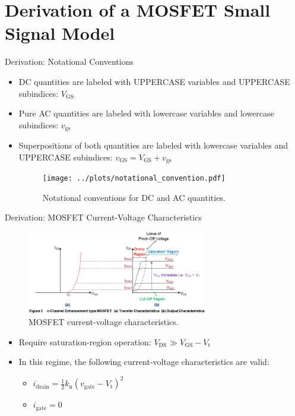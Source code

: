 \section{Derivation of a MOSFET Small Signal Model}
\begin{frame}{Derivation: Notational Conventions}
    \begin{itemize}
        \item DC quantities are labeled with UPPERCASE variables and UPPERCASE subindices: 
        $V_{\mathrm{GS}}$
        \item Pure AC quantities are labeled with lowercase variables and lowercase subindices: 
        $v_{\mathrm{gs}}$
        \item Superpositions of both quantities are labeled with lowercase variables and 
        UPPERCASE subindices: $v_{\mathrm{GS}}=V_{\mathrm{GS}}+v_{\mathrm{gs}}$

        \begin{figure}
            \centering
            \texttt{[image: ../plots/notational\_convention.pdf]}
            \caption{Notational conventions for DC and AC quantities.}
            \label{fig:signal_convention}
        \end{figure}
    \end{itemize}
\end{frame}

\begin{frame}{Derivation: MOSFET Current-Voltage Characteristics}
    \vspace{0.5cm}
    \begin{figure}
        \centering
        \includegraphics[width=0.7\textwidth]{../assets/mosfet_characteristics.png}
        \caption{MOSFET current-voltage characteristics.}
        \label{fig:mosfet_characteristics}
    \end{figure}
    \begin{itemize}
        \item Require saturation-region operation: $V_{\mathrm{DS}}\gg V_{\mathrm{GS}}-V_{\mathrm{t}}$
        \item In this regime, the following current-voltage characteristics are valid:
            \begin{itemize}
                \item $i_{\mathrm{drain}}=\frac{1}{2}k_{\mathrm{n}}(v_{\mathrm{gate}}-V_{\mathrm{t}})^{2}$
                \item $i_{\mathrm{gate}}=0$
            \end{itemize}
    \end{itemize}
\end{frame}

